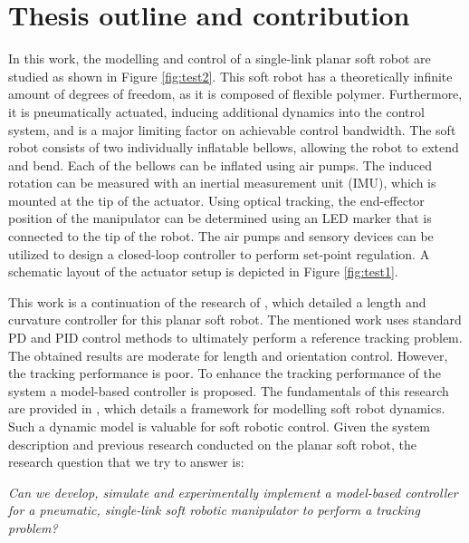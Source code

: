 \section*{Thesis outline and contribution}

In this work, the modelling and control of a single-link planar soft robot are studied as shown in Figure \ref{fig:test2}. This soft robot has a theoretically infinite amount of degrees of freedom, as it is composed of flexible polymer. Furthermore, it is pneumatically actuated, inducing additional dynamics into the control system, and is a major limiting factor on achievable control bandwidth. The soft robot consists of two individually inflatable bellows, allowing the robot to extend and bend. Each of the bellows can be inflated using air pumps. The induced rotation can be measured with an inertial measurement unit (IMU), which is mounted at the tip of the actuator. Using optical tracking, the end-effector position of the manipulator can be determined using an LED marker that is connected to the tip of the robot. The air pumps and sensory devices can be utilized to design a closed-loop controller to perform set-point regulation. A schematic layout of the actuator setup is depicted in Figure \ref{fig:test1}.

This work is a continuation of the research of \cite{berkers}, which detailed a length and curvature controller for this planar soft robot. The mentioned work uses standard PD and PID control methods to ultimately perform a reference tracking problem. The obtained results are moderate for length and orientation control. However, the tracking performance is poor. To enhance the tracking performance of the system a model-based controller is proposed. The fundamentals of this research are provided in \cite{Caasenbrood2020}, which details a framework for modelling soft robot dynamics. Such a dynamic model is valuable for soft robotic control. Given the system description and previous research conducted on the planar soft robot, the research question that we try to answer is:

\textit{Can we develop, simulate and experimentally implement a model-based controller for a pneumatic, single-link soft robotic manipulator to perform a tracking problem?}

